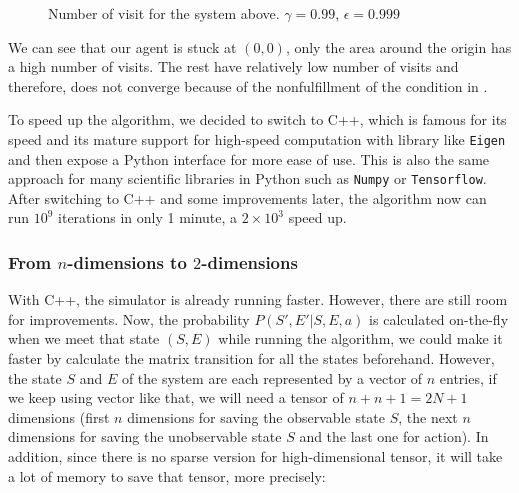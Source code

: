 \documentclass[
  a4paper, xcolor = usenames,dvipsnames]{article}
\newcommand{\passthrough}[1]{#1}
\begin{document}
\begin{figure}

{\centering {}

}

\caption{Number of visit for the system above. $\gamma = 0.99$, $\epsilon = 0.999$}\label{fig:10x10-python-n-visit}
\end{figure}

We can see that our agent is stuck at \((0, 0)\), only the area around the origin has a high number of visits. The rest have relatively low number of visits and therefore, does not converge because of the nonfulfillment of the condition in \autocite{q-learning-converge}.

To speed up the algorithm, we decided to switch to C++, which is famous for its speed and its mature support for high-speed computation with library like \passthrough{\lstinline!Eigen!} and then expose a Python interface for more ease of use. This is also the same approach for many scientific libraries in Python such as \passthrough{\lstinline!Numpy!} or \passthrough{\lstinline!Tensorflow!}. After switching to C++ and some improvements later, the algorithm now can run \(10^9\) iterations in only 1 minute, a \(2 \times 10^3\) speed up.

\hypertarget{from-n-dimensions-to-2-dimensions}{%
\subsubsection{\texorpdfstring{From \(n\)-dimensions to \(2\)-dimensions}{From n-dimensions to 2-dimensions}}\label{from-n-dimensions-to-2-dimensions}}

With C++, the simulator is already running faster. However, there are still room for improvements. Now, the probability \(P(S', E' | S, E, a)\) is calculated on-the-fly when we meet that state \((S, E)\) while running the algorithm, we could make it faster by calculate the matrix transition for all the states beforehand. However, the state \(S\) and \(E\) of the system are each represented by a vector of \(n\) entries, if we keep using vector like that, we will need a tensor of \(n + n + 1 = 2N + 1\) dimensions (first \(n\) dimensions for saving the observable state \(S\), the next \(n\) dimensions for saving the unobservable state \(S\) and the last one for action). In addition, since there is no sparse version for high-dimensional tensor, it will take a lot of memory to save that tensor, more precisely:
\end{document}
